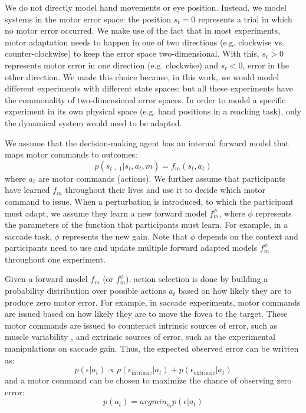 \documentclass[a4paper,doc,floatsintext,natbib]{apa6}
\begin{document}
We do not directly model hand movements or eye position. Instead, we model
systems in the motor error space: the position $s_t = 0$ represents a trial in
which no motor error occurred. We make use of the fact that in most
experiments, motor adaptation needs to happen in one of two directions
(e.g. clockwise vs. counter-clockwise) to keep the error space
two-dimensional. With this, $s_t > 0$ represents motor error in one direction
(e.g. clockwise) and $s_t < 0$, error in the other direction. We made this
choice because, in this work, we would model different experiments with
different state spaces; but all these experiments have the commonality of
two-dimensional error spaces. In order to model a specific experiment in its
own physical space (e.g. hand positions in a reaching task), only the dynamical
system would need to be adapted.

We assume that the decision-making agent has an internal forward model that
maps motor commands to outcomes:
\begin{equation}
p(s_{t+1} | s_t, a_t, m) = f_m(s_t, a_t)
\end{equation}
where $a_t$ are motor commands (actions). We further assume that participants
have learned $f_m$ throughout their lives and use it to decide which motor
command to issue. When a perturbation is introduced, to which the participant
must adapt, we assume they learn a new forward model $f_m^{\phi}$, where $\phi$
represents the parameters of the function that participants must learn. For
example, in a saccade task, $\phi$ represents the new gain. Note that $\phi$
depends on the context and participants need to use and update multiple
forward adapted models $f_m^{\phi}$ throughout one experiment.

Given a forward model $f_m$ (or $f_m^\phi$), action selection is done by
building a probability distribution over possible actions $a_t$ based on how
likely they are to produce zero motor error. For example, in saccade
experiments, motor commands are issued based on how likely they are to move the
fovea to the target. These motor commands are issued to counteract intrinsic
sources of error, such as muscle variability , and extrinsic
sources of error, such as the experimental manipulations on saccade gain. Thus,
the expected observed error can be written as:
\begin{equation}
p(\epsilon | a_t) \propto p(\epsilon_{\text{intrinsic}} | a_t) + p(\epsilon_{\text{extrinsic}} | a_t)
\end{equation}
and a motor command can be chosen to maximize the chance of observing zero error:
\begin{equation}
p(a_t) = argmin_{a_t} p(\epsilon | a_t)
\end{equation}
\end{document}
